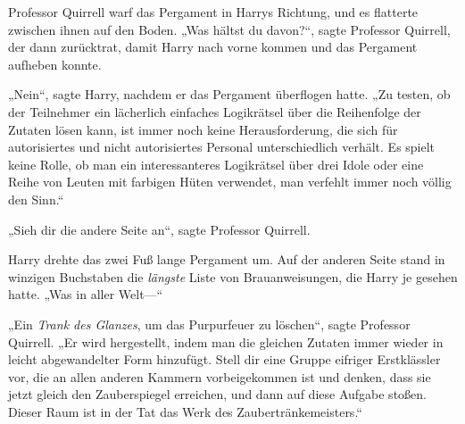 Professor Quirrell warf das Pergament in Harrys Richtung, und es flatterte zwischen ihnen auf den Boden.
„Was hältst du davon?“, sagte Professor Quirrell, der dann zurücktrat, damit Harry nach vorne kommen und das Pergament aufheben konnte.

„Nein“, sagte Harry, nachdem er das Pergament überflogen hatte. „Zu testen, ob der Teilnehmer ein lächerlich einfaches Logikrätsel über die Reihenfolge der Zutaten lösen kann, ist immer noch keine Herausforderung, die sich für autorisiertes und nicht autorisiertes Personal unterschiedlich verhält. Es spielt keine Rolle, ob man ein interessanteres Logikrätsel über drei Idole oder eine Reihe von Leuten mit farbigen Hüten verwendet, man verfehlt immer noch völlig den Sinn.“

„Sieh dir die andere Seite an“, sagte Professor Quirrell.

Harry drehte das zwei Fuß lange Pergament um.
Auf der anderen Seite stand in winzigen Buchstaben die \emph{längste} Liste von Brauanweisungen, die Harry je gesehen hatte. „Was in aller Welt—“

„Ein \emph{Trank des Glanzes}, um das Purpurfeuer zu löschen“, sagte Professor Quirrell.
„Er wird hergestellt, indem man die gleichen Zutaten immer wieder in leicht abgewandelter Form hinzufügt. Stell dir eine Gruppe eifriger Erstklässler vor, die an allen anderen Kammern vorbeigekommen ist und denken, dass sie jetzt gleich den Zauberspiegel erreichen, und dann auf diese Aufgabe stoßen. Dieser Raum ist in der Tat das Werk des Zaubertränkemeisters.“

